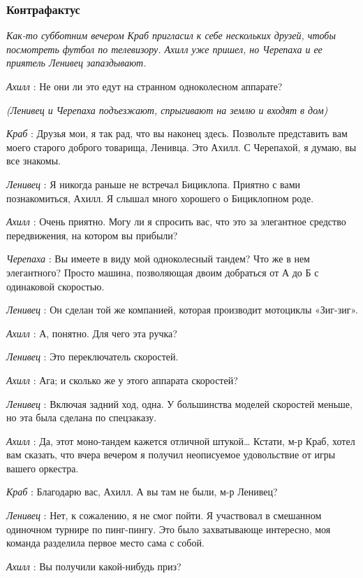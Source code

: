 \subsubsection{Контрафактус}

\emph{Как-то субботним вечером Краб пригласил к себе нескольких друзей, чтобы посмотреть футбол по телевизору. Ахилл уже пришел, но Черепаха и ее приятель Ленивец запаздывают.}

\emph{Ахилл} : Не они ли это едут на странном одноколесном аппарате?

\emph{(Ленивец и Черепаха подъезжают, спрыгивают на землю и входят в дом)}

\emph{Краб} : Друзья мои, я так рад, что вы наконец здесь. Позвольте представить вам моего старого доброго товарища, Ленивца. Это Ахилл. С Черепахой, я думаю, вы все знакомы.

\emph{Ленивец} : Я никогда раньше не встречал Бициклопа. Приятно с вами познакомиться, Ахилл. Я слышал много хорошего о Бициклопном роде.

\emph{Ахилл} : Очень приятно. Могу ли я спросить вас, что это за элегантное средство передвижения, на котором вы прибыли?

\emph{Черепаха} : Вы имеете в виду мой одноколесный тандем? Что же в нем элегантного? Просто машина, позволяющая двоим добраться от А до Б с одинаковой скоростью.

\emph{Ленивец} : Он сделан той же компанией, которая производит мотоциклы «Зиг-зиг».

\emph{Ахилл} : А, понятно. Для чего эта ручка?

\emph{Ленивец} : Это переключатель скоростей.

\emph{Ахилл} : Ага; и сколько же у этого аппарата скоростей?

\emph{Ленивец} : Включая задний ход, одна. У большинства моделей скоростей меньше, но эта была сделана по спецзаказу.

\emph{Ахилл} : Да, этот моно-тандем кажется отличной штукой\ldots{} Кстати, м-р Краб, хотел вам сказать, что вчера вечером я получил неописуемое удовольствие от игры вашего оркестра.

\emph{Краб} : Благодарю вас, Ахилл. А вы там не были, м-р Ленивец?

\emph{Ленивец} : Нет, к сожалению, я не смог пойти. Я участвовал в смешанном одиночном турнире по пинг-пингу. Это было захватывающе интересно, моя команда разделила первое место сама с собой.

\emph{Ахилл} : Вы получили какой-нибудь приз?

